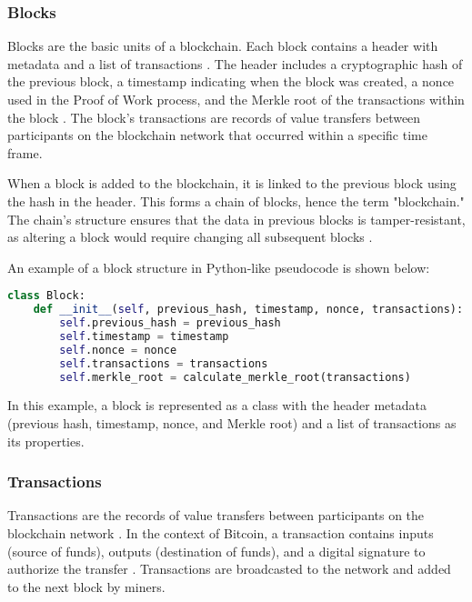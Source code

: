 \subsubsection{Blocks}
Blocks are the basic units of a blockchain. Each block contains a header with metadata and a list of transactions \cite{antonopoulos2014mastering}. The header includes a cryptographic hash of the previous block, a timestamp indicating when the block was created, a nonce used in the Proof of Work process, and the Merkle root of the transactions within the block \cite{merkle1987digital}. The block's transactions are records of value transfers between participants on the blockchain network that occurred within a specific time frame.

When a block is added to the blockchain, it is linked to the previous block using the hash in the header. This forms a chain of blocks, hence the term "blockchain." The chain's structure ensures that the data in previous blocks is tamper-resistant, as altering a block would require changing all subsequent blocks \cite{swan2015blockchain}.

An example of a block structure in Python-like pseudocode is shown below:

\begin{lstlisting}[language=Python, caption={Block Structure \cite{antonopoulos2014mastering}}, label={sc:blockStructure}]
class Block:
    def __init__(self, previous_hash, timestamp, nonce, transactions):
        self.previous_hash = previous_hash
        self.timestamp = timestamp
        self.nonce = nonce
        self.transactions = transactions
        self.merkle_root = calculate_merkle_root(transactions)
\end{lstlisting}

In this example, a block is represented as a class with the header metadata (previous hash, timestamp, nonce, and Merkle root) and a list of transactions as its properties.

\subsubsection{Transactions}
Transactions are the records of value transfers between participants on the blockchain network \cite{antonopoulos2014mastering}. In the context of Bitcoin, a transaction contains inputs (source of funds), outputs (destination of funds), and a digital signature to authorize the transfer \cite{nakamoto2008bitcoin}. Transactions are broadcasted to the network and added to the next block by miners.

